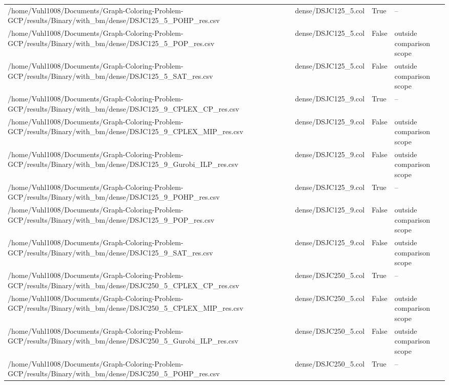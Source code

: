 \begin{table}[htbp]
\begin{tabular}{llll}
/home/Vuhl1008/Documents/Graph-Coloring-Problem-GCP/results/Binary/with\_bm/dense/DSJC125\_5\_POHP\_res.csv & dense/DSJC125\_5.col & True & -- \\
/home/Vuhl1008/Documents/Graph-Coloring-Problem-GCP/results/Binary/with\_bm/dense/DSJC125\_5\_POP\_res.csv & dense/DSJC125\_5.col & False & outside comparison scope \\
/home/Vuhl1008/Documents/Graph-Coloring-Problem-GCP/results/Binary/with\_bm/dense/DSJC125\_5\_SAT\_res.csv & dense/DSJC125\_5.col & False & outside comparison scope \\
/home/Vuhl1008/Documents/Graph-Coloring-Problem-GCP/results/Binary/with\_bm/dense/DSJC125\_9\_CPLEX\_CP\_res.csv & dense/DSJC125\_9.col & True & -- \\
/home/Vuhl1008/Documents/Graph-Coloring-Problem-GCP/results/Binary/with\_bm/dense/DSJC125\_9\_CPLEX\_MIP\_res.csv & dense/DSJC125\_9.col & False & outside comparison scope \\
/home/Vuhl1008/Documents/Graph-Coloring-Problem-GCP/results/Binary/with\_bm/dense/DSJC125\_9\_Gurobi\_ILP\_res.csv & dense/DSJC125\_9.col & False & outside comparison scope \\
/home/Vuhl1008/Documents/Graph-Coloring-Problem-GCP/results/Binary/with\_bm/dense/DSJC125\_9\_POHP\_res.csv & dense/DSJC125\_9.col & True & -- \\
/home/Vuhl1008/Documents/Graph-Coloring-Problem-GCP/results/Binary/with\_bm/dense/DSJC125\_9\_POP\_res.csv & dense/DSJC125\_9.col & False & outside comparison scope \\
/home/Vuhl1008/Documents/Graph-Coloring-Problem-GCP/results/Binary/with\_bm/dense/DSJC125\_9\_SAT\_res.csv & dense/DSJC125\_9.col & False & outside comparison scope \\
/home/Vuhl1008/Documents/Graph-Coloring-Problem-GCP/results/Binary/with\_bm/dense/DSJC250\_5\_CPLEX\_CP\_res.csv & dense/DSJC250\_5.col & True & -- \\
/home/Vuhl1008/Documents/Graph-Coloring-Problem-GCP/results/Binary/with\_bm/dense/DSJC250\_5\_CPLEX\_MIP\_res.csv & dense/DSJC250\_5.col & False & outside comparison scope \\
/home/Vuhl1008/Documents/Graph-Coloring-Problem-GCP/results/Binary/with\_bm/dense/DSJC250\_5\_Gurobi\_ILP\_res.csv & dense/DSJC250\_5.col & False & outside comparison scope \\
/home/Vuhl1008/Documents/Graph-Coloring-Problem-GCP/results/Binary/with\_bm/dense/DSJC250\_5\_POHP\_res.csv & dense/DSJC250\_5.col & True & -- \\

\end{tabular}
\end{table}
